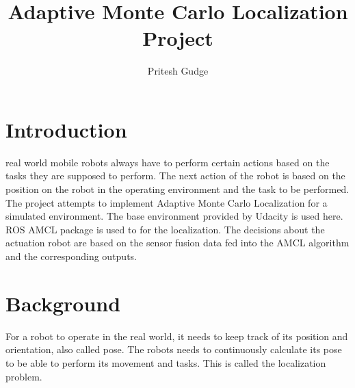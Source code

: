 \documentclass[10pt,journal,compsoc]{IEEEtran}
\begin{document}
\title{Adaptive Monte Carlo Localization Project}

\author{Pritesh Gudge}

%
{}


\maketitle
\IEEEdisplaynontitleabstractindextext
\IEEEpeerreviewmaketitle
\section{Introduction}
\label{sec:introduction}

 real world mobile robots always have to perform certain actions based on the tasks they are supposed to perform. The next action of the robot is based on the position on the robot in the operating environment and the task to be performed. The project attempts to implement Adaptive Monte Carlo Localization\cite{amcl} for a simulated environment. The base environment provided by Udacity is used here. ROS AMCL package is used to for the localization. The decisions about the actuation robot are based on the sensor fusion data fed into the AMCL algorithm and the corresponding outputs.


\section{Background}
For a robot to operate in the real world, it needs to keep track of its position and orientation, also called pose. The robots needs to continuously calculate its pose to be able to perform its movement and tasks. This is called the localization problem.
\end{document}
